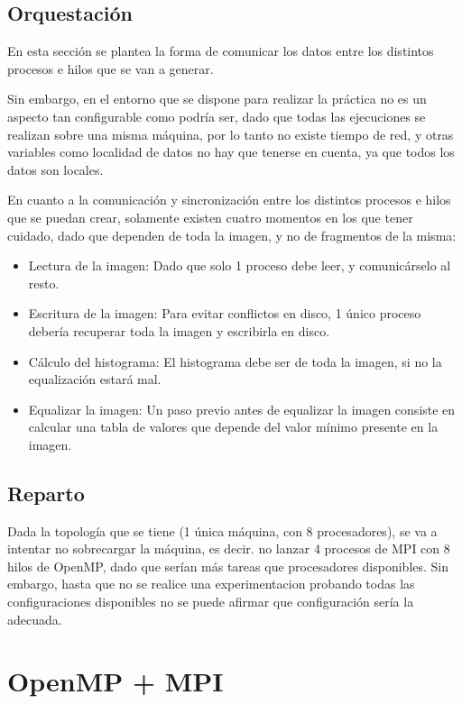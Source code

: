 \documentclass[12pt]{report} %
\begin{document}
\subsection{Orquestación}

En esta sección se plantea la forma de comunicar los datos entre los distintos procesos e hilos que se van a generar.

Sin embargo, en el entorno que se dispone para realizar la práctica no es un aspecto tan configurable como podría ser,
dado que todas las ejecuciones se realizan sobre una misma máquina, por lo tanto no existe tiempo de red, y otras
variables como localidad de datos no hay que tenerse en cuenta, ya que todos los datos son locales.

En cuanto a la comunicación y sincronización entre los distintos procesos e hilos que se puedan crear, solamente existen
cuatro momentos en los que tener cuidado, dado que dependen de toda la imagen, y no de fragmentos de la misma:

\begin{itemize}
  \item Lectura de la imagen: Dado que solo 1 proceso debe leer, y comunicárselo al resto.
  \item Escritura de la imagen: Para evitar conflictos en disco, 1 único proceso debería recuperar toda la imagen y
      escribirla en disco.
  \item Cálculo del histograma: El histograma debe ser de toda la imagen, si no la equalización estará mal.
  \item Equalizar la imagen: Un paso previo antes de equalizar la imagen consiste en calcular una tabla de valores
      que depende del valor mínimo presente en la imagen.
\end{itemize}


\subsection{Reparto}

Dada la topología que se tiene (1 única máquina, con 8 procesadores), se va a intentar no sobrecargar la máquina,
es decir. no lanzar 4 procesos de MPI con 8 hilos de OpenMP, dado que serían más tareas que procesadores
disponibles. Sin embargo, hasta que no se realice una experimentacion probando todas las configuraciones
disponibles no se puede afirmar que configuración sería la adecuada.

\section{OpenMP + MPI}
\label{sec:OpenMP+MPI}
\end{document}
